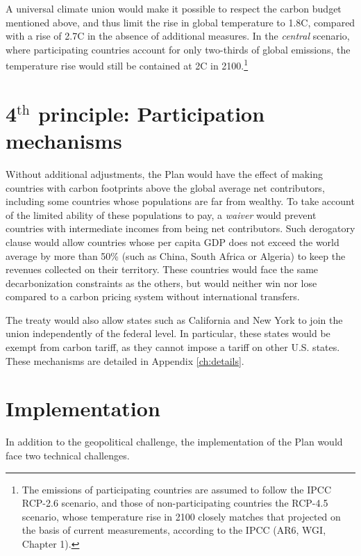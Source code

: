 \documentclass[a5paper,english,openany]{memoir}
\begin{document}
A universal climate union would make it possible to respect the carbon budget mentioned above, and thus limit the rise in global temperature to 1.8\textdegree{}C, compared with a rise of 2.7\textdegree{}C in the absence of additional measures. In the \textit{central} scenario, where participating countries account for only two-thirds of global emissions, the temperature rise would still be contained at 2\textdegree{}C in 2100.\footnote{The emissions of participating countries are assumed to follow the IPCC RCP-2.6 scenario, and those of non-participating countries the RCP-4.5 scenario, whose temperature rise in 2100 closely matches that projected on the basis of current measurements, according to the IPCC (AR6, WGI, Chapter 1).}

\section{4$^\text{th}$ principle: Participation mechanisms}

Without additional adjustments, the Plan would have the effect of making countries with carbon footprints above the global average net contributors, including some countries whose populations are far from wealthy. To take account of the limited ability of these populations to pay, a \textit{waiver} would prevent countries with intermediate incomes from being net contributors. Such derogatory clause would allow countries whose per capita GDP does not exceed the world average by more than 50\% (such as China, South Africa or Algeria) to keep the revenues collected on their territory. These countries would face the same decarbonization constraints as the others, but would neither win nor lose compared to a carbon pricing system without international transfers. 

The treaty would also allow states such as California and New York to join the union independently of the federal level. In particular, these states would be exempt from carbon tariff, as they cannot impose a tariff on other U.S. states. 
These mechanisms are detailed in Appendix \ref{ch:details}. 


\section{Implementation}\label{sec:implementation}
In addition to the geopolitical challenge, the implementation of the Plan would face two technical challenges. 
\end{document}
